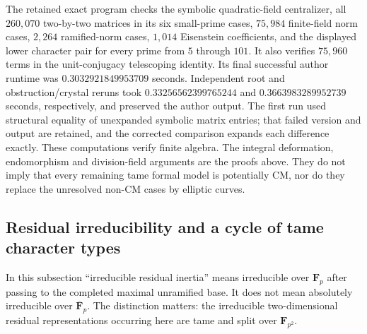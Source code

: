 \begin{remark}
\label{rem:B-RD52-scope}
The retained exact program
checks the symbolic quadratic-field centralizer, all
$260{,}070$ two-by-two matrices in its six small-prime cases,
$75{,}984$ finite-field norm cases, $2{,}264$ ramified-norm
cases, $1{,}014$ Eisenstein coefficients, and the displayed
lower character pair for every prime from $5$ through $101$.
It also verifies $75{,}960$ terms in the unit-conjugacy telescoping identity.
Its final successful author runtime was $0.3032921849953709$ seconds.
Independent root and obstruction/crystal reruns took
$0.33256562399765244$ and $0.3663983289952739$ seconds,
respectively, and preserved the author output.
The first run used structural equality of unexpanded symbolic
matrix entries; that failed version and output are retained,
and the corrected comparison expands each difference exactly.
These computations verify finite algebra. The integral
deformation, endomorphism and division-field arguments are
the proofs above. They do not imply that every remaining
tame formal model is potentially CM, nor do they replace
the unresolved non-CM cases by elliptic curves.
\end{remark}


\subsection{Residual irreducibility and a cycle of tame character types}

In this subsection ``irreducible residual inertia'' means irreducible
over $\mathbf F_p$ after passing to the completed maximal unramified
base. It does not mean absolutely irreducible over
$\overline{\mathbf F}_p$. The distinction matters: the irreducible
two-dimensional residual representations occurring here are tame
and split over $\mathbf F_{p^2}$.

